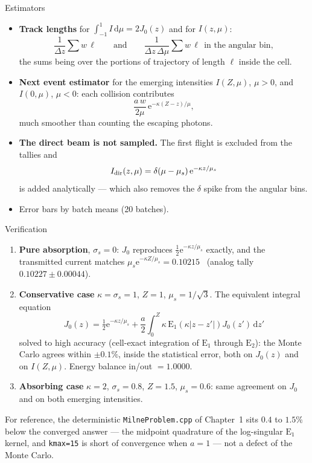 \documentclass[aspectratio=169,10pt]{beamer}
\renewcommand{\d}{\,\mathrm{d}}
\newcommand{\e}{\mathrm{e}}
\newcommand{\E}{\mathrm{E}}
\begin{document}
\begin{frame}{Estimators}
\begin{itemize}
\item \textbf{Track lengths} for $\displaystyle\int_{-1}^{1}I\d\mu=2J_0(z)$ and for
$I(z,\mu)$:
\[
\frac1{\Delta z}\sum w\,\ell \qquad\text{and}\qquad \frac1{\Delta z\,\Delta\mu}\sum w\,\ell
\ \ \text{in the angular bin},
\]
the sums being over the portions of trajectory of length $\ell$ inside the cell.
\item \textbf{Next event estimator} for the emerging intensities $I(Z,\mu)$, $\mu>0$, and
$I(0,\mu)$, $\mu<0$: each collision contributes
\[
\frac{a\,w}{2\mu}\,\e^{-\kappa(Z-z)/\mu},
\]
much smoother than counting the escaping photons.
\item \textbf{The direct beam is not sampled.} The first flight is excluded from the
tallies and
\[
I_{\rm dir}(z,\mu)=\delta(\mu-\mu_s)\,\e^{-\kappa z/\mu_s}
\]
is added analytically --- which also removes the $\delta$ spike from the angular bins.
\item Error bars by batch means (20 batches).
\end{itemize}
\end{frame}

\begin{frame}{Verification}
\begin{enumerate}\itemsep4pt
\item \textbf{Pure absorption}, $\sigma_s=0$: $J_0$ reproduces $\frac12\e^{-\kappa z/\mu_s}$
exactly, and the transmitted current matches
$\mu_s\e^{-\kappa Z/\mu_s}=0.10215$ \ (analog tally $0.10227\pm0.00044$).
\item \textbf{Conservative case} $\kappa=\sigma_s=1$, $Z=1$, $\mu_s=1/\sqrt3$. The
equivalent integral equation
\[
J_0(z)=\tfrac12\e^{-\kappa z/\mu_s}+\frac a2\int_0^Z\kappa\,\E_1(\kappa|z-z'|)J_0(z')\d z'
\]
solved to high accuracy (cell-exact integration of $\E_1$ through $\E_2$): the Monte Carlo
agrees within $\pm0.1\%$, inside the statistical error, both on $J_0(z)$ and on $I(Z,\mu)$.
Energy balance in/out $=1.0000$.
\item \textbf{Absorbing case} $\kappa=2$, $\sigma_s=0.8$, $Z=1.5$, $\mu_s=0.6$: same
agreement on $J_0$ and on both emerging intensities.
\end{enumerate}
\medskip

{\footnotesize For reference, the deterministic \texttt{MilneProblem.cpp} of Chapter~1 sits
$0.4$ to $1.5\%$ below the converged answer --- the midpoint quadrature of the log-singular
$\E_1$ kernel, and \texttt{kmax=15} is short of convergence when $a=1$ --- not a defect of
the Monte Carlo.}
\end{frame}
\end{document}

